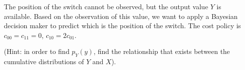 \vspace{-0.2cm} The position of the switch cannot be observed, but the output value $Y$
is available. Based on the observation of this value, we want to apply
a Bayesian decision maker to predict which is the position of the switch.
The cost policy is $c_{00}=c_{11}=0$, $c_{10}=2c_{01}$.
 
 (Hint: in order to find $p_Y(y)$, find the relationship that exists between the cumulative distributions of $Y$ and $X$).

